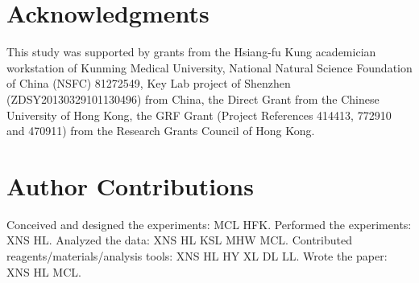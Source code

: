 \documentclass[10pt,letterpaper]{article}
\begin{document}
\section*{Acknowledgments}

This study was supported by grants from the Hsiang-fu Kung academician workstation of Kunming Medical University, National Natural Science Foundation of China (NSFC) 81272549, Key Lab project of Shenzhen (ZDSY20130329101130496) from China, the Direct Grant from the Chinese University of Hong Kong, the GRF Grant (Project References 414413, 772910 and 470911) from the Research Grants Council of Hong Kong.

\section*{Author Contributions}

Conceived and designed the experiments: MCL HFK. Performed the experiments: XNS HL. Analyzed the data: XNS HL KSL MHW MCL. Contributed reagents/materials/analysis tools: XNS HL HY XL DL LL. Wrote the paper: XNS HL MCL.

\nolinenumbers

%
%
% 




\end{document}

